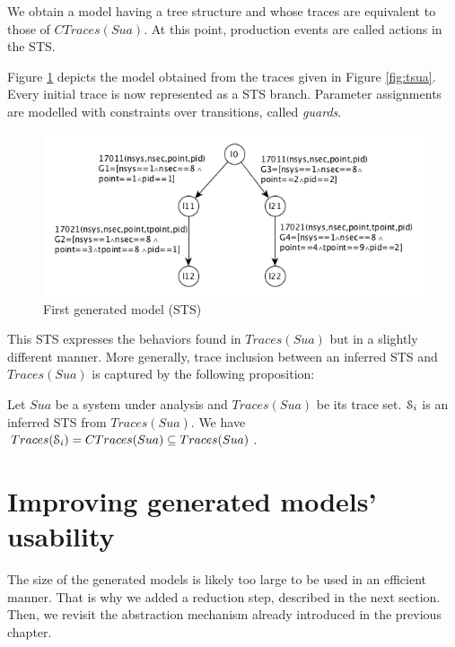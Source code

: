 We obtain a model having a tree structure and whose traces are
equivalent to those of $CTraces(Sua)$. At this point, production
events are called actions in the STS.

Figure \ref{fig:firstmodel} depicts the model obtained from the
traces given in Figure \ref{fig:tsua}. Every initial trace is now
represented as a STS branch. Parameter assignments are modelled
with constraints over transitions, called \textit{guards}.

\begin{figure}[ht]
  \includegraphics[width=1.0\linewidth]{figures/STS1.png}

  \caption{First generated model (STS)}
  \label{fig:firstmodel}
\end{figure}

This STS expresses the behaviors found in $Traces(Sua)$ but in a
slightly different manner. More generally, trace inclusion
between an inferred STS and $Traces(Sua)$ is captured by the
following proposition:

\begin{proposition}
  Let $\mathit{Sua}$ be a system under analysis and $Traces(Sua)$ be its
  trace set. $\EuScript{S}_i$ is an inferred STS from
  $Traces(Sua)$.
  We have $Traces(\EuScript{S}_i) = CTraces(Sua) \subseteq Traces(Sua)$.

	\label{def:equivtraces_IOSTS}
\end{proposition}


\section{Improving generated models' usability}
\label{sec:modelinf:usability}

The size of the generated models is likely too large to be used
in an efficient manner. That is why we added a reduction step,
described in the next section. Then, we revisit the abstraction
mechanism already introduced in the previous chapter.

